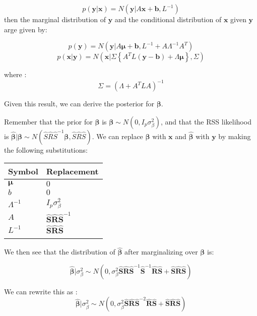$$p(\textbf{y}|\textbf{x}) = N(\textbf{y}|A\textbf{x}+\textbf{b},L^{-1})$$
then the marginal distribution of \(\textbf{y}\) and the conditional distribution of \(\textbf{x}\) given \(\textbf{y}\) arge given by: 

$$ p(\textbf{y}) = N(\textbf{y}|A\boldsymbol{\mu}+\textbf{b},L^{-1}+A\Lambda^{-1}A^{T})$$
$$p(\textbf{x}|\textbf{y}) = N(\textbf{x}| \Sigma \left\{ A^{T} L ( \textbf{y} - \textbf{b} ) + \Lambda \boldsymbol{\mu} \right\} , \Sigma)$$

where :
$$\Sigma = (\Lambda + A^{T}LA)^{-1}$$

Given this result, we can derive the posterior for \(\boldsymbol{\beta}\).

Remember that the prior for \(\boldsymbol{\beta}\) is \(\boldsymbol{\beta} \sim N(0,I_p\sigma^2_\beta)\), and that the RSS likelihood is \(\hat{\boldsymbol{\beta}} | \boldsymbol{\beta} \sim N(\hat{S}\hat{R}\hat{S}^{-1}\boldsymbol{\beta},\hat{S}\hat{R}\hat{S})\).  
We can replace \(\boldsymbol{\beta}\) with \(\textbf{x}\) and \(\hat{\boldsymbol{\beta}}\) with \(\textbf{y}\) by making the following substitutions:

\begin{center}
\begin{tabular}{ll}
Symbol & Replacement\\
\hline
\(\boldsymbol{\mu}\) & \(0\)\\
\(b\) & \(0\)\\
\(\Lambda^{-1}\) & \(I_p \sigma^2_\beta\)\\
\(A\) & \(\hat{\textbf{S}}\hat{\textbf{R}}\hat{\textbf{S}}^{-1}\)\\
\(L^{-1}\) & \(\hat{\textbf{S}}\hat{\textbf{R}}\hat{\textbf{S}}\)\\
 & \\
\end{tabular}
\end{center}

We then see that the distribution of \(\hat{\boldsymbol{\beta}}\) after marginalizing over $\boldsymbol{\beta}$ is:

$$ \hat{\boldsymbol{\beta}}|\sigma_\beta^2 \sim N(0,\sigma_\beta^2\hat{\textbf{S}}\hat{\textbf{R}}\hat{\textbf{S}}^{-1}\hat{\textbf{S}}^{-1}\hat{\textbf{R}}\hat{\textbf{S}}+\hat{\textbf{S}}\hat{\textbf{R}}\hat{\textbf{S}})$$ 

We can rewrite this as :
$$\hat{\boldsymbol{\beta}}|\sigma_\beta^2 \sim  N(0,\sigma_\beta^2\hat{\textbf{S}}\hat{\textbf{R}}\hat{\textbf{S}}^{-2}\hat{\textbf{R}}\hat{\textbf{S}}+\hat{\textbf{S}}\hat{\textbf{R}}\hat{\textbf{S}}) $$


